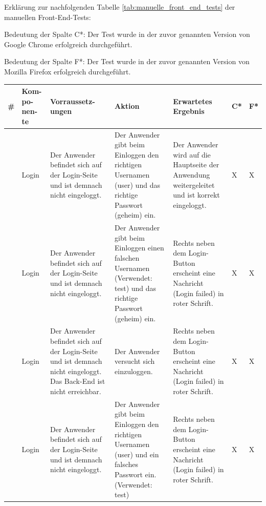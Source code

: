 Erklärung zur nachfolgenden Tabelle \ref{tab:manuelle_front_end_tests} der manuellen Front-End-Tests:\newline

Bedeutung der Spalte C*: Der Test wurde in der zuvor genannten Version von Google Chrome erfolgreich durchgeführt.\newline

Bedeutung der Spalte F*: Der Test wurde in der zuvor genannten Version von Mozilla Firefox erfolgreich durchgeführt.

\begin{longtable}{| p{} | p{} | p{} | p{} | p{} | p{} | p{} |}
	\hline
	
	\textbf{\#} & \textbf{Kom-po-nen-te} & \textbf{Vorraussetz-ungen} & \textbf{Aktion} & \textbf{Erwartetes Ergebnis} & \textbf{C*} & \textbf{F*} \\ \hline
	
	\stepcounter{TestNumber}\arabic{TestNumber} & Login & Der Anwender befindet sich auf der Login-Seite und ist demnach nicht eingeloggt. & Der Anwender gibt beim Einloggen den richtigen Usernamen (user) und das richtige Passwort (geheim) ein. & Der Anwender wird auf die Hauptseite der Anwendung weitergeleitet und ist	korrekt eingeloggt. & X & X \\ \hline
	
	\stepcounter{TestNumber}\arabic{TestNumber} & Login & Der Anwender befindet sich auf der Login-Seite und ist demnach nicht
	eingeloggt. & Der Anwender gibt beim
	Einloggen einen falschen Usernamen (Verwendet: test) und das richtige Passwort (geheim) ein. & Rechts neben dem Login-Button erscheint eine Nachricht (Login failed) in roter Schrift. & X & X \\ \hline
	
	\stepcounter{TestNumber}\arabic{TestNumber} & Login & Der Anwender befindet sich auf der Login-Seite und ist demnach nicht
	eingeloggt. Das Back-End ist nicht erreichbar. & Der Anwender versucht sich einzuloggen. & Rechts neben dem Login-Button erscheint eine Nachricht (Login failed) in roter Schrift. & X & X \\ \hline
	
	\stepcounter{TestNumber}\arabic{TestNumber} & Login & Der Anwender befindet sich auf der Login-Seite und ist demnach nicht eingeloggt. & Der Anwender gibt beim
	Einloggen den richtigen Usernamen (user) und ein falsches Passwort ein. (Verwendet: test) & Rechts neben dem Login-Button  erscheint eine Nachricht (Login failed) in roter Schrift. & X & X \\ \hline
	

\end{longtable}
